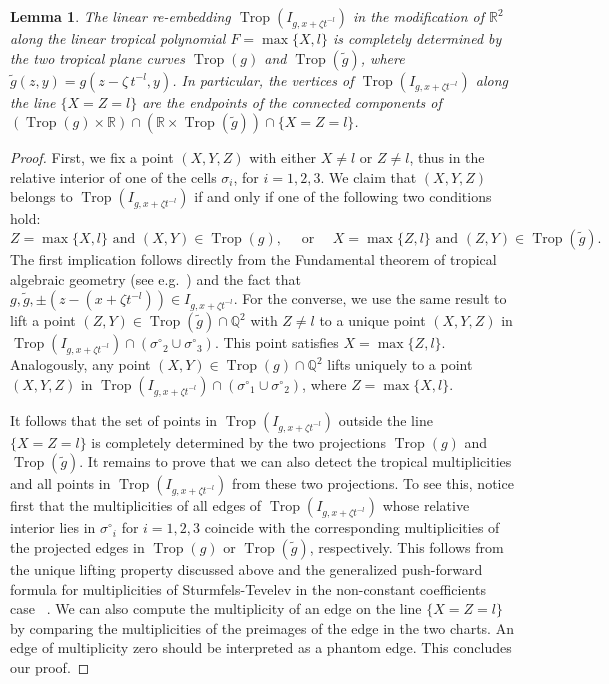 \documentclass[11pt]{amsart}
\numberwithin{equation}{section}
\theoremstyle{plain}
\newtheorem{lemma}[theorem]{Lemma}
\theoremstyle{definition}
\theoremstyle{remark}
\begin{document}
\begin{lemma}\label{lem:ModifViaProjections}
  The linear re-embedding $\operatorname{Trop}(I_{g,x+{\zeta} t^{-l}})$ in the
  modification of ${\mathbb{R}}^2$ along the linear tropical polynomial
  $F=\max\{X, l\}$ is completely determined by the two tropical plane
  curves $\operatorname{Trop}(g)$ and $\operatorname{Trop}(\tilde{g})$, where
  $\tilde{g}(z,y)=g(z-{\zeta} \,t^{-l},y)$. In particular, the vertices of
  $\operatorname{Trop}(I_{g, x+{\zeta} t^{-l}})$ along the line $\{X=Z=l\}$ are 
  the endpoints of the connected components of $( \operatorname{Trop}(g)\times {\mathbb{R}})\cap
 ({\mathbb{R}}\times  \operatorname{Trop}(\tilde{g}))\cap\{X=Z=l\}$.
\end{lemma}
\begin{proof} First, we fix a point $(X,Y,Z)$ with either $X\neq l$ or
  $Z\neq l$, thus in the relative interior of one of the cells
  $\sigma_i$, for $i=1,2,3$. We claim that $(X,Y,Z)$ belongs to
  $\operatorname{Trop}(I_{g,x+{\zeta} t^{-l}})$ if and only if one of the following two
  conditions hold:
\[ Z= \max\{X,l\}\text{ and }(X,Y)\in \operatorname{Trop}(g), \quad \text{ or }
 \quad X= \max\{Z,l\}\text{ and }(Z,Y)\in \operatorname{Trop}(\tilde{g}).
\]
  The first implication follows directly from the Fundamental theorem
  of tropical algebraic geometry (see e.g.~\cite[Theorem 3.2.5]{MS09}) and the fact that $g,
  \tilde{g}, \pm (z-(x+{\zeta} t^{-l})) \in I_{g,x+{\zeta}
    t^{-l}}$. For the converse, 
we use the same result to lift a  point  $(Z,Y)\in
  \operatorname{Trop}(\tilde{g})\cap {\mathbb{Q}}^2$ with $Z\neq l$ to a unique point
 $(X,Y,Z)$ in $\operatorname{Trop}(I_{g,x+{\zeta}
    t^{-l}})\cap({\sigma^{\circ}}_2\cup {\sigma^{\circ}}_3)$. This
  point satisfies $X=\max\{Z,l\}$.   Analogously, any point  $(X,Y) \in \operatorname{Trop}(g)\cap {\mathbb{Q}}^2$ lifts uniquely to a point
  $(X,Y,Z)$ in $\operatorname{Trop}(I_{g,x+{\zeta}
    t^{-l}})\cap({\sigma^{\circ}}_1\cup{\sigma^{\circ}}_2)$,  where $Z=\max\{X,l\}$. 

  It follows that the set of points in $\operatorname{Trop}(I_{g,x+{\zeta} t^{-l}})$
  outside the line $\{X=Z=l\}$ is completely determined by the two
  projections $\operatorname{Trop}(g)$ and $\operatorname{Trop}(\tilde{g})$. It remains to prove
  that we can also detect the tropical multiplicities and all points
  in $\operatorname{Trop}(I_{g,x+{\zeta} t^{-l}})
  $ from these two projections. To see this, notice first that the
  multiplicities of all edges of $\operatorname{Trop}(I_{g,x+{\zeta} t^{-l}})$ whose
  relative interior lies in ${\sigma^{\circ}}_i$ for $i=1,2,3$ coincide with
  the corresponding multiplicities of the projected edges in
  $\operatorname{Trop}(g)$ or $\operatorname{Trop}(\tilde{g})$, respectively. This follows from
  the unique lifting property discussed above and the generalized
  push-forward formula for multiplicities of Sturmfels-Tevelev in the
  non-constant coefficients case
  ~\cite[Theorem~8.4]{BPR11}. We can also compute the multiplicity of
  an edge on the line $\{X=Z=l\}$ by comparing the multiplicities of
  the preimages of the edge in the two charts. An edge of multiplicity
  zero should be interpreted as a phantom edge. This concludes our
  proof.
\end{proof}
\end{document}
